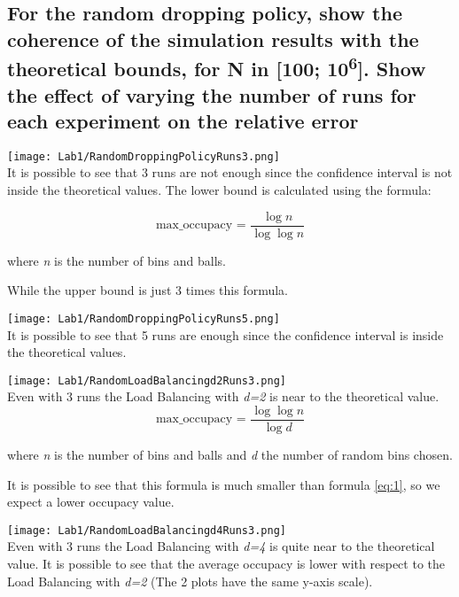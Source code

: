 \documentclass{report}
\begin{document}
{			\subsection{For the random dropping policy, show the coherence of the simulation results with the theoretical bounds, for N in [100; 10\textsuperscript{6}]. Show the effect of varying the number of runs for each experiment on the relative error}
			
			\texttt{[image: Lab1/RandomDroppingPolicyRuns3.png]} \\
			It is possible to see that 3 runs are not enough since the confidence interval is not inside the theoretical values.
			The lower bound is calculated using the formula:
			
			\begin{equation} \label{eq:1}
				 \text{max\_occupacy = }\frac{\log n}{\log \log n} 
			\end{equation}
			\begin{center}
					where \emph{n} is the number of bins and balls.
			\end{center}
			While the upper bound is just 3 times this formula.
			
			\texttt{[image: Lab1/RandomDroppingPolicyRuns5.png]} \\
			It is possible to see that 5 runs are enough since the confidence interval is inside the theoretical values.
			
			\vspace{20px}
			
			\texttt{[image: Lab1/RandomLoadBalancingd2Runs3.png]} \\
			Even with 3 runs the Load Balancing with \emph{d=2} is near to the theoretical value.
			\begin{equation} \label{eq:2}
				 \text{max\_occupacy = }\frac{\log \log n}{\log d}
			\end{equation}
			\begin{center}
					where \emph{n} is the number of bins and balls and \emph{d} the number of random bins chosen.
			\end{center}
			It is possible to see that this formula is much smaller than formula \ref{eq:1}, so we expect a lower occupacy value.
			
			\vspace{20px}
			
			\texttt{[image: Lab1/RandomLoadBalancingd4Runs3.png]} \\
			Even with 3 runs the Load Balancing with \emph{d=4} is quite near to the theoretical value. 
			It is possible to see that the average occupacy is lower with respect to the Load Balancing with \emph{d=2} (The 2 plots have the same y-axis scale).
			
}
\end{document}
